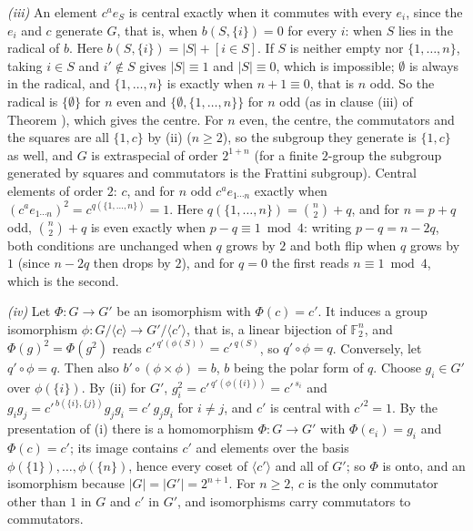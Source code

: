 \emph{(iii)} An element $c^{a}e_{S}$ is central exactly when it commutes with every $e_{i}$, since the $e_{i}$ and $c$ generate $G$, that is, when $b(S, \{i\}) = 0$ for every $i$: when $S$ lies in the radical of $b$. Here $b(S, \{i\}) = |S| + [i \in S]$. If $S$ is neither empty nor $\{1, \dots, n\}$, taking $i \in S$ and $i' \notin S$ gives $|S| \equiv 1$ and $|S| \equiv 0$, which is impossible; $\emptyset$ is always in the radical, and $\{1, \dots, n\}$ is exactly when $n + 1 \equiv 0$, that is $n$ odd. So the radical is $\{\emptyset\}$ for $n$ even and $\{\emptyset, \{1, \dots, n\}\}$ for $n$ odd (as in clause (iii) of Theorem ), which gives the centre. For $n$ even, the centre, the commutators and the squares are all $\{1, c\}$ by (ii) ($n \ge 2$), so the subgroup they generate is $\{1, c\}$ as well, and $G$ is extraspecial of order $2^{1+n}$ (for a finite $2$-group the subgroup generated by squares and commutators is the Frattini subgroup). Central elements of order $2$: $c$, and for $n$ odd $c^{a}e_{1 \cdots n}$ exactly when $(c^{a}e_{1 \cdots n})^{2} = c^{q(\{1, \dots, n\})} = 1$. Here $q(\{1, \dots, n\}) = \binom{n}{2} + q$, and for $n = p + q$ odd, $\binom{n}{2} + q$ is even exactly when $p - q \equiv 1 \bmod 4$: writing $p - q = n - 2q$, both conditions are unchanged when $q$ grows by $2$ and both flip when $q$ grows by $1$ (since $n - 2q$ then drops by $2$), and for $q = 0$ the first reads $n \equiv 1 \bmod 4$, which is the second.

\emph{(iv)} Let $\Phi : G \to G'$ be an isomorphism with $\Phi(c) = c'$. It induces a group isomorphism $\phi : G/\langle c\rangle \to G'/\langle c'\rangle$, that is, a linear bijection of $\mathbb{F}_{2}^{n}$, and $\Phi(g)^{2} = \Phi(g^{2})$ reads $c'^{\,q'(\phi(S))} = c'^{\,q(S)}$, so $q' \circ \phi = q$. Conversely, let $q' \circ \phi = q$. Then also $b' \circ (\phi \times \phi) = b$, $b$ being the polar form of $q$. Choose $g_{i} \in G'$ over $\phi(\{i\})$. By (ii) for $G'$, $g_{i}^{2} = c'^{\,q'(\phi(\{i\}))} = c'^{\,s_{i}}$ and $g_{i}g_{j} = c'^{\,b(\{i\}, \{j\})}g_{j}g_{i} = c'\,g_{j}g_{i}$ for $i \ne j$, and $c'$ is central with $c'^{2} = 1$. By the presentation of (i) there is a homomorphism $\Phi : G \to G'$ with $\Phi(e_{i}) = g_{i}$ and $\Phi(c) = c'$; its image contains $c'$ and elements over the basis $\phi(\{1\}), \dots, \phi(\{n\})$, hence every coset of $\langle c'\rangle$ and all of $G'$; so $\Phi$ is onto, and an isomorphism because $|G| = |G'| = 2^{n+1}$. For $n \ge 2$, $c$ is the only commutator other than $1$ in $G$ and $c'$ in $G'$, and isomorphisms carry commutators to commutators.


